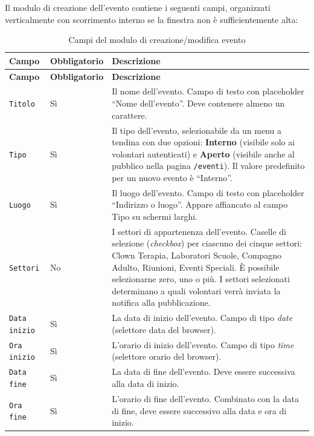 \documentclass[a4paper,11pt,oneside]{book}
\newcommand{\campo}[1]{\texttt{#1}}
\newcommand{\percorso}[1]{\textcolor{namoCyan}{\texttt{#1}}}
\begin{document}
Il modulo di creazione dell'evento contiene i seguenti campi, organizzati verticalmente con scorrimento interno se la finestra non \`e sufficientemente alta:

\begin{longtable}{l l p{7.5cm}}
\caption{Campi del modulo di creazione/modifica evento} \label{tab:campi-evento} \\
\toprule
\textbf{Campo} & \textbf{Obbligatorio} & \textbf{Descrizione} \\
\midrule
\endfirsthead
\toprule
\textbf{Campo} & \textbf{Obbligatorio} & \textbf{Descrizione} \\
\midrule
\endhead
\campo{Titolo} & S\`i & Il nome dell'evento. Campo di testo con placeholder ``Nome dell'evento''. Deve contenere almeno un carattere. \\[6pt]

\campo{Tipo} & S\`i & Il tipo dell'evento, selezionabile da un menu a tendina con due opzioni: \textbf{Interno} (visibile solo ai volontari autenticati) e \textbf{Aperto} (visibile anche al pubblico nella pagina \percorso{/eventi}). Il valore predefinito per un nuovo evento \`e ``Interno''. \\[6pt]

\campo{Luogo} & S\`i & Il luogo dell'evento. Campo di testo con placeholder ``Indirizzo o luogo''. Appare affiancato al campo Tipo su schermi larghi. \\[6pt]

\campo{Settori} & No & I settori di appartenenza dell'evento. Caselle di selezione (\textit{checkbox}) per ciascuno dei cinque settori: Clown Terapia, Laboratori Scuole, Compagno Adulto, Riunioni, Eventi Speciali. \`E possibile selezionarne zero, uno o pi\`u. I settori selezionati determinano a quali volontari verr\`a inviata la notifica alla pubblicazione. \\[6pt]

\campo{Data inizio} & S\`i & La data di inizio dell'evento. Campo di tipo \textit{date} (selettore data del browser). \\[6pt]

\campo{Ora inizio} & S\`i & L'orario di inizio dell'evento. Campo di tipo \textit{time} (selettore orario del browser). \\[6pt]

\campo{Data fine} & S\`i & La data di fine dell'evento. Deve essere successiva alla data di inizio. \\[6pt]

\campo{Ora fine} & S\`i & L'orario di fine dell'evento. Combinato con la data di fine, deve essere successivo alla data e ora di inizio. \\[6pt]


\end{longtable}
\end{document}
